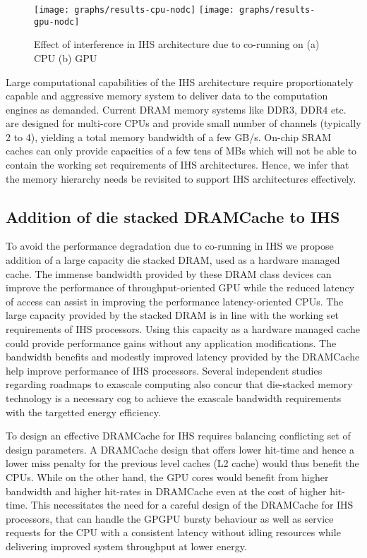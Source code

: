 \begin{figure}[htb]
	\centering
	\texttt{[image: graphs/results-cpu-nodc]}
	\texttt{[image: graphs/results-gpu-nodc]}
	\caption{Effect of interference in IHS architecture due to co-running on (a) CPU (b) GPU}
	\label{results-interference}
\end{figure}

\par Large computational capabilities of the IHS architecture require proportionately capable and aggressive memory system to deliver data to the computation engines as demanded. Current DRAM memory systems like DDR3, DDR4 etc. are designed for multi-core CPUs and provide small number of channels (typically 2 to 4), yielding a total memory bandwidth of a few GB/s. On-chip SRAM caches can only provide capacities of a few tens of MBs which will not be able to contain the working set requirements of IHS architectures. Hence, we infer that the memory hierarchy needs be revisited to support IHS architectures effectively.


\subsection{Addition of die stacked DRAMCache to IHS}
To avoid the performance degradation due to co-running in IHS we propose addition of a large capacity die stacked DRAM, used as a hardware managed cache. The immense bandwidth provided by these DRAM class devices can improve the performance of throughput-oriented GPU while the reduced latency of access can assist in improving the performance latency-oriented CPUs. The large capacity provided by the stacked DRAM is in line with the working set requirements of IHS processors. Using this capacity as a hardware managed cache could provide performance gains without any application modifications. The bandwidth benefits and modestly improved latency provided by the DRAMCache help improve performance of IHS processors. Several independent studies regarding roadmaps to exascale computing \cite{apu-exascale,amd-exascale1} also concur that die-stacked memory technology is a necessary cog to achieve the exascale bandwidth requirements with the targetted energy efficiency. 
\par To design an effective DRAMCache for IHS requires balancing conflicting set of design parameters. A DRAMCache design that offers lower hit-time and hence a lower miss penalty for the previous level caches (L2 cache) would thus benefit the CPUs. While on the other hand, the GPU cores would benefit from higher bandwidth and higher hit-rates in DRAMCache even at the cost of higher hit-time. This necessitates the need for a careful design of the DRAMCache for IHS processors, that can handle the GPGPU bursty behaviour as well as service requests for the CPU with a consistent latency without idling resources while delivering improved system throughput at lower energy.

